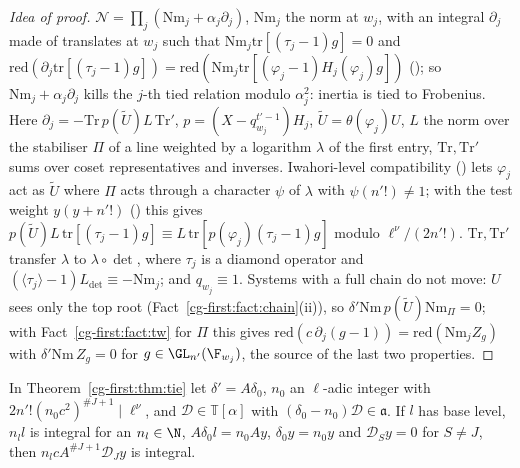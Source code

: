 \begin{proof}[Idea of proof]
$\mathcal N=\prod_j(\mathrm{Nm}_j+\alpha_j\partial_j)$, $\mathrm{Nm}_j$ the norm at $w_j$, with an integral
$\partial_j$ made of translates at $w_j$ such that $\mathrm{Nm}_j\mathrm{tr}[(\tau_j-1)g]=0$ and
$\mathrm{red}(\partial_j\mathrm{tr}[(\tau_j-1)g])=\mathrm{red}(\mathrm{Nm}_j\mathrm{tr}[(\varphi_j-1)H_j(\varphi_j)g])$
(); so
$\mathrm{Nm}_j+\alpha_j\partial_j$ kills the $j$-th tied relation modulo $\alpha_j^2$: inertia is tied to
Frobenius. Here $\partial_j=-\mathrm{Tr}\,p(\tilde U)L\,\mathrm{Tr}'$, $p=(X-q_{w_j}^{t'-1})H_j$,
$\tilde U=\theta(\varphi_j)U$, $L$ the norm over the stabiliser $\Pi$ of a line weighted by a logarithm
$\lambda$ of the first entry, $\mathrm{Tr},\mathrm{Tr}'$ sums over coset representatives and inverses. Iwahori-level compatibility
() lets $\varphi_j$ act as $\tilde U$ where $\Pi$
acts through a character $\psi$ of $\lambda$ with $\psi(n'!)\ne1$; with the test weight $y(y+n'!)$
() this gives $p(\tilde U)L\,\mathrm{tr}[(\tau_j-1)g]
\equiv L\,\mathrm{tr}[p(\varphi_j)(\tau_j-1)g]$ modulo $\ell^\nu/(2n'!)$. $\mathrm{Tr},\mathrm{Tr}'$ transfer
$\lambda$ to $\lambda\circ\det$, where $\tau_j$ is a diamond operator and $(\langle\tau_j\rangle-1)
L_{\det}\equiv-\mathrm{Nm}_j$; and $q_{w_j}\equiv1$.
Systems with a full chain do not move: $U$ sees only the top root (Fact~\ref{cg-first:fact:chain}(ii)),
so $\delta'\mathrm{Nm}\,p(\tilde U)\mathrm{Nm}_\Pi=0$; with Fact~\ref{cg-first:fact:tw} for $\Pi$ this gives
$\mathrm{red}(c\,\partial_j(g-1))=\mathrm{red}(\mathrm{Nm}_jZ_g)$ with $\delta'\mathrm{Nm}\,Z_g=0$ for
$g\in\GL_{n'}(\F_{w_j})$, the source of the last two properties.
\end{proof}

\begin{theorem}\label{cg-first:thm:top}
In Theorem~\ref{cg-first:thm:tie} let $\delta'=A\delta_0$, $n_0$ an $\ell$-adic integer with
$2n'!(n_0c^2)^{\#J+1}\mid\ell^\nu$, and $\mathcal D\in\mathbb T[\alpha]$ with
$(\delta_0-n_0)\mathcal D\in\mathfrak a$. If $l$ has base level, $n_ll$ is integral for an $n_l\in\N$, $A\delta_0l=n_0Ay$,
$\delta_0y=n_0y$ and $\mathcal D_Sy=0$ for $S\neq J$, then $n_lcA^{\#J+1}\mathcal D_Jy$ is integral.
\end{theorem}

